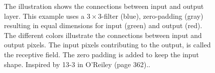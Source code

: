 \begin{figure}
    \caption{The illustration shows the connections between input and output layer. This example uses a $3\times 3$-filter (blue), zero-padding (gray) resulting in equal dimensions for input (green) and output (red). The different colors illustrate the connections between input and output pixels. The input pixels contributing to the output, is called the receptive field. The zero padding is added to keep the input shape. Inspired by 13-3 in O'Reiley (page 362)..
    }
    \label{fig:convolution_padding}
\end{figure}